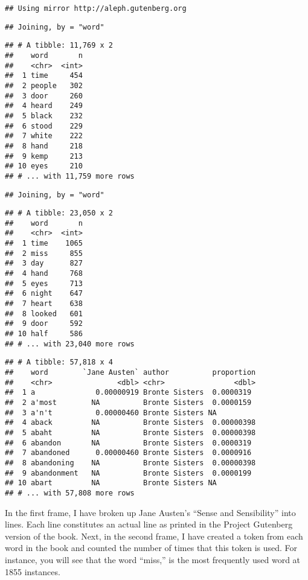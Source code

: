 \documentclass[]{article}
\begin{document}
\begin{verbatim}
## Using mirror http://aleph.gutenberg.org
\end{verbatim}

\begin{verbatim}
## Joining, by = "word"
\end{verbatim}

\begin{verbatim}
## # A tibble: 11,769 x 2
##    word       n
##    <chr>  <int>
##  1 time     454
##  2 people   302
##  3 door     260
##  4 heard    249
##  5 black    232
##  6 stood    229
##  7 white    222
##  8 hand     218
##  9 kemp     213
## 10 eyes     210
## # ... with 11,759 more rows
\end{verbatim}

\begin{verbatim}
## Joining, by = "word"
\end{verbatim}

\begin{verbatim}
## # A tibble: 23,050 x 2
##    word       n
##    <chr>  <int>
##  1 time    1065
##  2 miss     855
##  3 day      827
##  4 hand     768
##  5 eyes     713
##  6 night    647
##  7 heart    638
##  8 looked   601
##  9 door     592
## 10 half     586
## # ... with 23,040 more rows
\end{verbatim}

\begin{verbatim}
## # A tibble: 57,818 x 4
##    word        `Jane Austen` author          proportion
##    <chr>               <dbl> <chr>                <dbl>
##  1 a              0.00000919 Bronte Sisters  0.0000319 
##  2 a'most        NA          Bronte Sisters  0.0000159 
##  3 a'n't          0.00000460 Bronte Sisters NA         
##  4 aback         NA          Bronte Sisters  0.00000398
##  5 abaht         NA          Bronte Sisters  0.00000398
##  6 abandon       NA          Bronte Sisters  0.0000319 
##  7 abandoned      0.00000460 Bronte Sisters  0.0000916 
##  8 abandoning    NA          Bronte Sisters  0.00000398
##  9 abandonment   NA          Bronte Sisters  0.0000199 
## 10 abart         NA          Bronte Sisters NA         
## # ... with 57,808 more rows
\end{verbatim}

In the first frame, I have broken up Jane Austen's ``Sense and
Sensibility'' into lines. Each line constitutes an actual line as
printed in the Project Gutenberg version of the book. Next, in the
second frame, I have created a token from each word in the book and
counted the number of times that this token is used. For instance, you
will see that the word ``miss,'' is the most frequently used word at
1855 instances.
\end{document}
